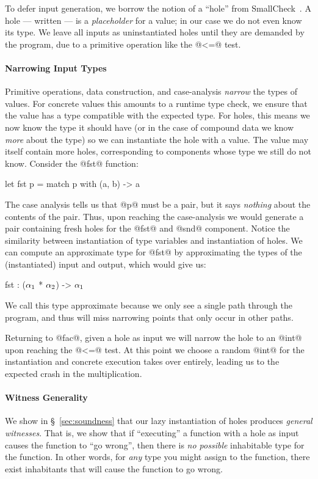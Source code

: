 To defer input generation, we borrow the notion of a ``hole'' from
SmallCheck~\cite{runciman_smallcheck_2008}.
%
A hole --- written \ehole{} --- is a \emph{placeholder} for a value; in
our case we do not even know its type.
%
We leave all inputs as uninstantiated holes until they are demanded by
the program, \eg due to a primitive operation like the @<=@ test.

\paragraph{Narrowing Input Types}
Primitive operations, data construction, and case-analysis \emph{narrow}
the types of values.
%
For concrete values this amounts to a runtime type check, we ensure that
the value has a type compatible with the expected type.
%
For holes, this means we now know the type it should
have (or in the case of compound data we know \emph{more} about the
type) so we can instantiate the hole with a value.
%
The value may itself contain more holes, corresponding to components
whose type we still do not know.
%
Consider the @fst@ function:
%
\begin{code}
  let fst p = match p with
    (a, b) -> a
\end{code}
%
The case analysis tells us that @p@ must be a pair, but it says
\emph{nothing} about the contents of the pair.
%
Thus, upon reaching the case-analysis we would generate a pair
containing fresh holes for the @fst@ and @snd@ component.
%
Notice the similarity between instantiation of type variables and
instantiation of holes.
%
We can compute an approximate type for @fst@ by approximating the types
of the (instantiated) input and output, which would give us:
%
\begin{mcode}
  fst : ($\alpha_1$ * $\alpha_2$) -> $\alpha_1$
\end{mcode}
%
We call this type approximate because we only see a single path through
the program, and thus will miss narrowing points that only occur in
other paths.

Returning to @fac@, given a hole as input we will narrow the hole
to an @int@ upon reaching the @<=@ test.
%
At this point we choose a random @int@ for the instantiation and
concrete execution takes over entirely, leading us to the expected crash
in the multiplication.

\paragraph{Witness Generality}
We show in \S~\ref{sec:soundness} that our lazy instantiation of holes
produces \emph{general witnesses}.
%
That is, we show that if ``executing''
a function with a hole as input causes the
function to ``go wrong'', then there is
\emph{no possible} inhabitable type for the function.
%
In other words, for \emph{any} type you might
assign to the function, there exist inhabitants
that will cause the function to go wrong.

